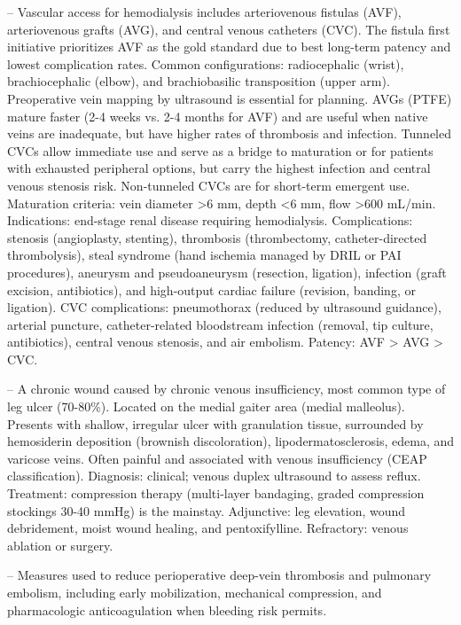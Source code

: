 -- Vascular access for hemodialysis includes arteriovenous fistulas (AVF), arteriovenous grafts (AVG), and central venous catheters (CVC). The fistula first initiative prioritizes AVF as the gold standard due to best long-term patency and lowest complication rates. Common configurations: radiocephalic (wrist), brachiocephalic (elbow), and brachiobasilic transposition (upper arm). Preoperative vein mapping by ultrasound is essential for planning. AVGs (PTFE) mature faster (2-4 weeks vs. 2-4 months for AVF) and are useful when native veins are inadequate, but have higher rates of thrombosis and infection. Tunneled CVCs allow immediate use and serve as a bridge to maturation or for patients with exhausted peripheral options, but carry the highest infection and central venous stenosis risk. Non-tunneled CVCs are for short-term emergent use. Maturation criteria: vein diameter >6 mm, depth <6 mm, flow >600 mL/min. Indications: end-stage renal disease requiring hemodialysis. Complications: stenosis (angioplasty, stenting), thrombosis (thrombectomy, catheter-directed thrombolysis), steal syndrome (hand ischemia managed by DRIL or PAI procedures), aneurysm and pseudoaneurysm (resection, ligation), infection (graft excision, antibiotics), and high-output cardiac failure (revision, banding, or ligation). CVC complications: pneumothorax (reduced by ultrasound guidance), arterial puncture, catheter-related bloodstream infection (removal, tip culture, antibiotics), central venous stenosis, and air embolism. Patency: AVF > AVG > CVC.

-- A chronic wound caused by chronic venous insufficiency, most common type of leg ulcer (70-80\%). Located on the medial gaiter area (medial malleolus). Presents with shallow, irregular ulcer with granulation tissue, surrounded by hemosiderin deposition (brownish discoloration), lipodermatosclerosis, edema, and varicose veins. Often painful and associated with venous insufficiency (CEAP classification). Diagnosis: clinical; venous duplex ultrasound to assess reflux. Treatment: compression therapy (multi-layer bandaging, graded compression stockings 30-40 mmHg) is the mainstay. Adjunctive: leg elevation, wound debridement, moist wound healing, and pentoxifylline. Refractory: venous ablation or surgery.

-- Measures used to reduce perioperative deep-vein thrombosis and pulmonary embolism, including early mobilization, mechanical compression, and pharmacologic anticoagulation when bleeding risk permits.

